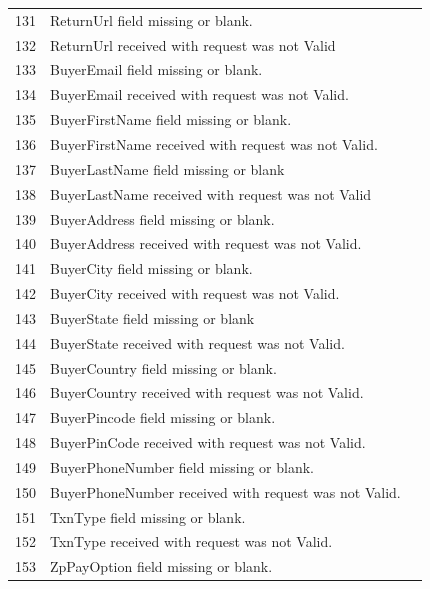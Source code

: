 \documentclass{article}
\newcommand{\xmark}{\ding{55}}
\begin{document}
\begin{longtable}{||c|p{12.5cm}||c|}
131 &ReturnUrl field missing or blank.& \textcolor{red} {\xmark} \\
132 &ReturnUrl received with request was not Valid& \textcolor{red} {\xmark} \\
133 &BuyerEmail field missing or blank.& \textcolor{red} {\xmark} \\
134 &BuyerEmail received with request was not Valid.& \textcolor{red} {\xmark} \\
135 &BuyerFirstName field missing or blank.& \textcolor{red} {\xmark} \\
136 &BuyerFirstName received with request was not Valid.& \textcolor{red} {\xmark} \\
137 &BuyerLastName field missing or blank& \textcolor{red} {\xmark} \\
138 &BuyerLastName received with request was not Valid& \textcolor{red} {\xmark} \\
139 &BuyerAddress field missing or blank.& \textcolor{red} {\xmark} \\
140 &BuyerAddress received with request was not Valid.& \textcolor{red} {\xmark} \\
141 &BuyerCity field missing or blank.& \textcolor{red} {\xmark} \\
142 &BuyerCity received with request was not Valid.& \textcolor{red} {\xmark} \\
143 &BuyerState field missing or blank& \textcolor{red} {\xmark} \\
144 &BuyerState received with request was not Valid.& \textcolor{red} {\xmark} \\
145 &BuyerCountry field missing or blank.& \textcolor{red} {\xmark} \\
146 &BuyerCountry received with request was not Valid.& \textcolor{red} {\xmark} \\
147 &BuyerPincode field missing or blank.& \textcolor{red} {\xmark} \\
148 &BuyerPinCode received with request was not Valid.& \textcolor{red} {\xmark} \\
149 &BuyerPhoneNumber field missing or blank.& \textcolor{red} {\xmark} \\
150 &BuyerPhoneNumber received with request was not Valid.& \textcolor{red} {\xmark} \\
151 &TxnType field missing or blank.& \textcolor{red} {\xmark} \\
152 &TxnType received with request was not Valid.& \textcolor{red} {\xmark} \\
153 &ZpPayOption field missing or blank.& \textcolor{red} {\xmark} \\

\end{longtable}
\end{document}
